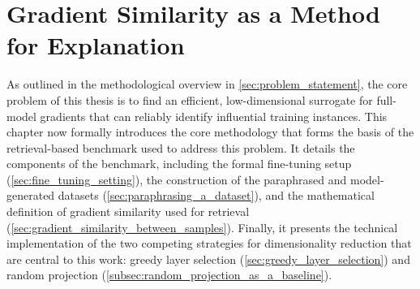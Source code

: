 \chapter{Gradient Similarity as a Method for Explanation}\label{cha:gradient_similarity}
As outlined in the methodological overview in \autoref{sec:problem_statement}, the core problem of this thesis is to find an efficient, low-dimensional surrogate for full-model gradients that can reliably identify influential training instances. This chapter now formally introduces the core methodology that forms the basis of the retrieval-based benchmark used to address this problem. It details the components of the benchmark, including the formal fine-tuning setup (\autoref{sec:fine_tuning_setting}), the construction of the paraphrased and model-generated datasets (\autoref{sec:paraphrasing_a_dataset}), and the mathematical definition of gradient similarity used for retrieval (\autoref{sec:gradient_similarity_between_samples}). Finally, it presents the technical implementation of the two competing strategies for dimensionality reduction that are central to this work: greedy layer selection (\autoref{sec:greedy_layer_selection}) and random projection (\autoref{subsec:random_projection_as_a_baseline}).

